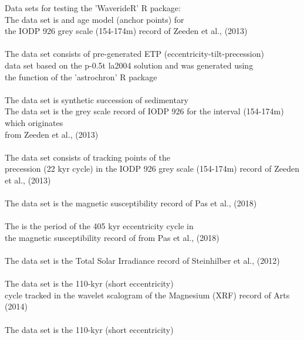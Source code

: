\documentclass[a4paper]{book}
\begin{document}
%
\begin{Description}
Data sets for testing the 'WaverideR' R package:\\{}
The  data set is and age model (anchor points) for\\{}
the IODP 926 grey scale (154-174m) record of Zeeden et al., (2013)\\{}
\\{}
The  data set consists of pre-generated ETP (eccentricity-tilt-precession)\\{}
data set based on the p-0.5t  la2004 solution and was generated using \\{}
the  function of the 'astrochron' R package \\{}
\\{}
The  data set is synthetic succession of sedimentary\\{}
The  data set is the grey scale record of IODP 926 for the interval (154-174m) which originates\\{} from
Zeeden et al., (2013) \\{}
\\{}
The  data set consists of tracking points of the\\{}
precession (22 kyr cycle) in the IODP 926 grey scale (154-174m) record of Zeeden et al., (2013)\\{}
\\{}
The  data set is the magnetic susceptibility record of Pas et al., (2018)\\{}
\\{}
The  is the period of the 405 kyr eccentricity cycle in\\{}
the magnetic susceptibility record of from Pas et al., (2018)\\{}
\\{}
The  data set is the Total Solar Irradiance record of Steinhilber et al., (2012)\\{}
\\{}
The  data set is the 110-kyr (short eccentricity) \\{}
cycle tracked in the wavelet scalogram of the Magnesium (XRF) record of Arts (2014)\\{}
\\{}
The  data set is the 110-kyr (short eccentricity) \\{}

\end{Description}
\end{document}
